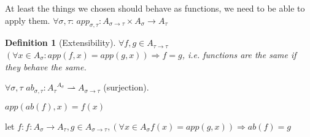 \documentclass[a4paper,10pt]{book}
\newtheorem{definition}{Definition}
\begin{document}
At least the things we chosen should behave as functions, we need to be able to apply them.
$\forall \sigma, \tau$: $app_{\sigma,\tau} : A_{\sigma \rightarrow \tau} \times A_{\sigma} 
\rightarrow A_{\tau}$

\begin{definition}[Extensibility]
$\forall f,g \in A_{\tau \rightarrow \tau}$ $(\forall x \in A_{\sigma}: app(f,x) = app(g,x)) \Rightarrow f = g$, i.e. functions are the same if they behave the same.
\end{definition}

$\forall \sigma,\tau$  $ab_{\sigma,\tau}: {A_\tau}^{A_\sigma} \rightharpoonup A_{\sigma \rightarrow \tau}$ (surjection).

$app (ab(f), x) = f(x)$

let $f: f: A_{\sigma} \rightarrow A_{\tau}, g \in A_{\sigma \rightarrow \tau}, 
(\forall x \in A_{\sigma} f(x) = app(g,x)) \Rightarrow ab(f) = g$
\end{document}
